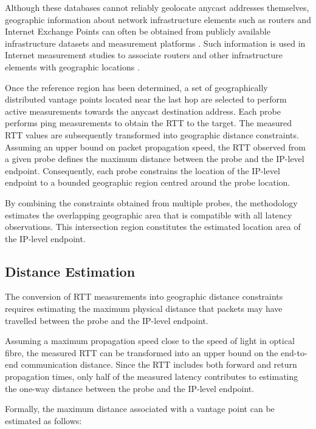 Although these databases cannot reliably geolocate anycast addresses themselves, geographic information about network infrastructure elements such as routers and Internet Exchange Points can often be obtained from publicly available infrastructure datasets and measurement platforms \cite{RIPEIPmap, Candela2025UsingInfrastructure}. Such information is used in Internet measurement studies to associate routers and other infrastructure elements with geographic locations \cite{CAIDAITK}.

Once the reference region has been determined, a set of geographically distributed vantage points  located near the last hop are selected to perform active measurements towards the anycast destination address. Each probe performs ping measurements to obtain the RTT to the target. The measured RTT values are subsequently transformed into geographic distance constraints. Assuming an upper bound on packet propagation speed, the RTT observed from a given probe defines the maximum distance between the probe and the IP-level endpoint. Consequently, each probe constrains the location of the IP-level endpoint to a bounded geographic region centred around the probe location.

By combining the constraints obtained from multiple probes, the methodology estimates the overlapping geographic area that is compatible with all latency observations. This intersection region constitutes the estimated location area of the IP-level endpoint.

\subsection{Distance Estimation}
\label{sc:hunter_multilateration_distance_estimation}

The conversion of RTT measurements into geographic distance constraints requires estimating the maximum physical distance that packets may have travelled between the probe and the IP-level endpoint.

Assuming a maximum propagation speed close to the speed of light in optical fibre, the measured RTT can be transformed into an upper bound on the end-to-end communication distance. Since the RTT includes both forward and return propagation times, only half of the measured latency contributes to estimating the one-way distance between the probe and the IP-level endpoint.

Formally, the maximum distance associated with a vantage point can be estimated as follows:

